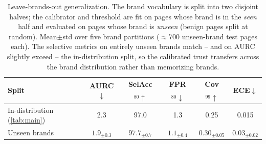 \begin{table}[!h]
\caption{Leave-brands-out generalization. The brand vocabulary is split into two disjoint
halves; the calibrator and threshold are fit on pages whose brand is in the \emph{seen} half
and evaluated on pages whose brand is \emph{unseen} (benign pages split at random). Mean$\pm$std
over five brand partitions ($\approx$700 unseen-brand test pages each). The selective metrics
on entirely unseen brands match -- and on AURC slightly exceed -- the in-distribution split,
so the calibrated trust transfers across the brand distribution rather than memorizing brands.}
\label{tab:brands_out}
\footnotesize
\setlength{\tabcolsep}{3.0pt}
\begin{tabular*}{\columnwidth}{@{\extracolsep{\fill}}lccccc@{}}
\toprule
Split & AURC$\downarrow$ & SelAcc$_{80}\uparrow$ & FPR$_{80}\downarrow$ & Cov$_{99}\uparrow$ & ECE$\downarrow$ \\
\midrule
In-distribution (\autoref{tab:main}) & 2.3 & 97.0 & 1.3 & 0.25 & 0.015 \\
Unseen brands & $1.9_{\pm0.3}$ & $97.7_{\pm0.7}$ & $1.1_{\pm0.4}$ & $0.30_{\pm0.05}$ & $0.03_{\pm0.02}$ \\
\bottomrule
\end{tabular*}
\end{table}
